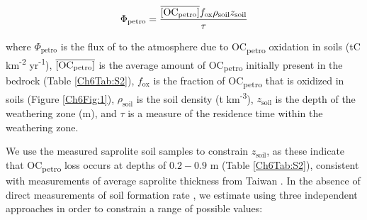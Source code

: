\begin{equation}\label{Ch6Eq:6}
	\Phi_{\text{petro}} = \frac{\overline{[\text{OC}_{\text{petro}}]} f_{\text{ox}} \rho_{\text{soil}} z_{\text{soil}}}{\tau}
\end{equation}

where $\Phi_{\text{petro}}$ is the flux of  to the atmosphere due to OC\textsubscript{petro} oxidation in soils (tC km\textsuperscript{-2} yr\textsuperscript{-1}), $\overline{[\text{OC}_{\text{petro}}]}$ is the average amount of OC\textsubscript{petro} initially present in the bedrock (Table \ref{Ch6Tab:S2}), $f_{\text{ox}}$ is the fraction of OC\textsubscript{petro} that is oxidized in soils (Figure \ref{Ch6Fig:1}), $\rho_{\text{soil}}$ is the soil density (t km\textsuperscript{-3}), $z_{\text{soil}}$ is the depth of the weathering zone (m), and $\tau$ is a measure of the residence time within the weathering zone.

We use the measured saprolite soil samples to constrain $z_{\text{soil}}$, as these indicate that OC\textsubscript{petro} loss occurs at depths of $0.2 - 0.9$ m (Table \ref{Ch6Tab:S2}), consistent with measurements of average saprolite thickness from Taiwan \citep{Tsai:2001vp}. In the absence of direct measurements of soil formation rate \citep[\textit{e.g.}][]{Larsen:2014gq}, we estimate  using three independent approaches in order to constrain a range of possible values:

